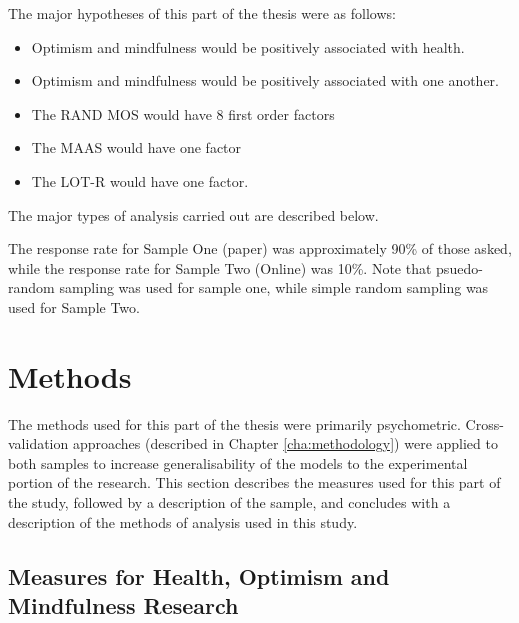 \documentclass{article}
\begin{document}
The major hypotheses of this part of the thesis were as follows:
\begin{itemize}
\item Optimism and mindfulness would be positively associated with health.

\item Optimism and mindfulness would be positively associated with one another. 

\item The RAND MOS would have 8 first order factors%

\item The MAAS would have one factor

\item The LOT-R would have one factor.
\end{itemize}

The major types of analysis carried out are described below. 

The response rate for Sample One (paper) was approximately
90\% of those asked, while the response rate for Sample Two (Online)
was 10\%. Note that psuedo-random sampling was used for sample one, while simple random sampling was used for Sample Two. 

\section{Methods}

The methods used for this part of the thesis were primarily psychometric. Cross-validation approaches (described in Chapter \ref{cha:methodology}) were applied to both samples to increase generalisability of the models to the experimental portion of the research. This section describes the measures used for this part of the study, followed by a description of the sample, and concludes with a description of the methods of analysis used in this study. 

\subsection{Measures for Health, Optimism and Mindfulness Research}
\end{document}
